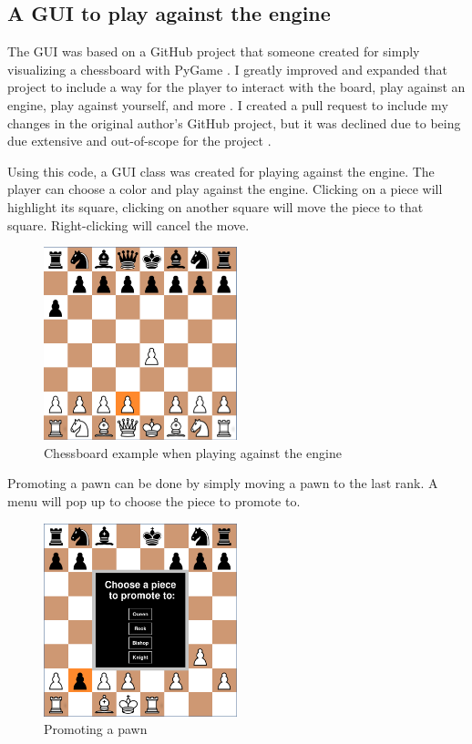\documentclass{article}
\begin{document}
\subsection{A GUI to play against the engine}

The GUI was based on a GitHub project that someone created for simply visualizing a chessboard with PyGame \cite{adefokunChessboardAhirajustice2022, pygame}.
I greatly improved and expanded that project to include a way for the player to interact with the board, play against an engine,
play against yourself, and more \cite{zjefferChessboardZjeffer2022}. I created a pull request to include my changes in the original author's GitHub project,
but it was declined due to being due extensive and out-of-scope for the project \cite{adefokunChessboard2022pull}.

Using this code, a GUI class was created for playing against the engine. The player can choose a color and play against
the engine. Clicking on a piece will highlight its square, clicking on another square will move the piece to that square.
Right-clicking will cancel the move.

\begin{figure}[H]
    \centering
    \includegraphics[width=0.5\textwidth]{img/chessboard-gui.png}
    \caption{Chessboard example when playing against the engine}
\end{figure}

Promoting a pawn can be done by simply moving a pawn to the last rank. A menu will pop up 
to choose the piece to promote to.

\begin{figure}[H]
    \centering
    \includegraphics[width=0.5\textwidth]{img/chessboard-promotion.png}
    \caption{Promoting a pawn}
\end{figure}
\end{document}
